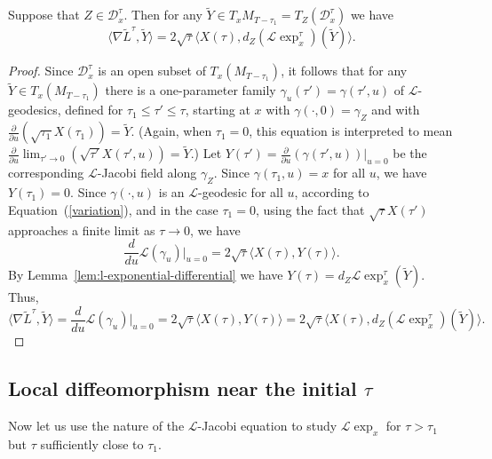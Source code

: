 \begin{lemma}\label{lem:l-length-tilde-gradient}
\label{DtildeL}

Suppose that $Z\in {\mathcal D}^{\tau}_x$. Then for any $\widetilde
Y\in T_xM_{T-\tau_1}=T_Z({\mathcal D}^{\tau}_x)$ we have
$$ \langle \nabla\widetilde L^{\tau},\widetilde Y\rangle =2\sqrt{\tau}\langle
X(\tau),d_Z\left({\mathcal L}\exp_x^{\tau}\right)(\widetilde
Y)\rangle.$$
\end{lemma}


\begin{proof}
\sketch
{}
Since ${\mathcal D}^{\tau}_x$ is an open subset of $T_x(M_{T-\tau_1})$, it
follows that for any $\widetilde Y\in T_x(M_{T-\tau_1})$ there is a
one-parameter family $\gamma_u(\tau')=\gamma(\tau',u)$ of
 ${\mathcal L}$-geodesics, defined for $\tau_1\le \tau'\le \tau$,
starting at $x$ with $\gamma(\cdot,0)=\gamma_Z$ and with
$\frac{\partial}{\partial u}\left(\sqrt{\tau_1}X(\tau_1)\right)=\widetilde Y$.
(Again, when $\tau_1=0$, this equation is interpreted to mean
$\frac{\partial}{\partial u}\lim_{\tau'\rightarrow
0}(\sqrt{\tau'}X(\tau',u))=\widetilde Y$.) Let
$Y(\tau')=\frac{\partial}{\partial u}(\gamma(\tau',u))|_{u=0}$ be the
corresponding ${\mathcal L}$-Jacobi field along $\gamma_Z$. Since
$\gamma(\tau_1,u)=x$ for all $u$, we have $Y(\tau_1)=0$. Since
$\gamma(\cdot,u)$ is an ${\mathcal L}$-geodesic for all $u$, according to
Equation~(\ref{variation}), and in the case $\tau_1=0$, using the fact that
$\sqrt{\tau}X(\tau')$ approaches a finite limit as $\tau\rightarrow 0$, we have
$$\frac{d}{du}{\mathcal
L}(\gamma_u)|_{u=0}=2\sqrt{\tau}\langle X(\tau),Y(\tau)\rangle.$$ By
Lemma~\ref{lem:l-exponential-differential} we have $Y(\tau)=d_Z{\mathcal L}\exp_x^{\tau}(\tilde
Y)$. Thus,
$$\langle\nabla\widetilde L^{\tau},\widetilde Y\rangle=\frac{d}{du}{\mathcal
L}(\gamma_u)|_{u=0}=2\sqrt{\tau}\langle
X(\tau),Y(\tau)\rangle=2\sqrt{\tau}\langle X(\tau),d_Z({\mathcal
L}\exp^{\tau}_x)(\widetilde Y)\rangle.$$
\end{proof}


\subsection{Local diffeomorphism near the initial $\tau$}

Now let us use the nature of the ${\mathcal L}$-Jacobi equation to
study ${\mathcal L}\exp_x$ for $\tau>\tau_1$ but $\tau$
sufficiently close to $\tau_1$.

